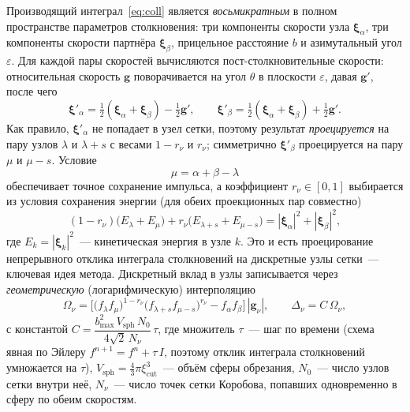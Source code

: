 \documentclass[14pt,a4paper]{extreport}
\numberwithin{equation}{chapter}
\numberwithin{figure}{chapter}
\numberwithin{table}{chapter}
\newcommand{\xv}{\boldsymbol{\xi}}
\newcommand{\gv}{\mathbf{g}}
\begin{document}
Производящий интеграл~\eqref{eq:coll} является \emph{восьмикратным} в полном пространстве параметров столкновения: три
компоненты скорости узла $\xv_\alpha$, три компоненты скорости партнёра $\xv_\beta$, прицельное расстояние $b$ и
азимутальный угол $\varepsilon$.
Для каждой пары скоростей вычисляются пост-столкновительные скорости: относительная скорость $\gv$ поворачивается на
угол $\theta$ в плоскости $\varepsilon$, давая $\gv'$, после чего
\begin{equation}
  \xv'_\alpha=\tfrac12(\xv_\alpha+\xv_\beta)-\tfrac12\gv',\qquad
  \xv'_\beta=\tfrac12(\xv_\alpha+\xv_\beta)+\tfrac12\gv'.
\end{equation}
Как правило, $\xv'_\alpha$ не попадает в узел сетки, поэтому результат \emph{проецируется} на пару узлов $\lambda$ и
$\lambda+s$ с весами $1-r_\nu$ и $r_\nu$; симметрично $\xv'_\beta$ проецируется на пару $\mu$ и $\mu-s$.
Условие
\begin{equation}
  \mu=\alpha+\beta-\lambda
\end{equation}
обеспечивает точное сохранение импульса, а коэффициент $r_\nu\in[0,1]$ выбирается из условия сохранения энергии (для
обеих проекционных пар совместно)
\begin{equation}
  (1-r_{\nu})\big(E_{\lambda}+E_{\mu}\big)+r_\nu\big(E_{\lambda+s}+E_{\mu-s}\big)=|\xv_\alpha|^2+|\xv_\beta|^2,
\end{equation}
где $E_k=|\xv_k|^2$~--- кинетическая энергия в узле $k$.
Это и есть проецирование непрерывного отклика интеграла столкновений на дискретные узлы сетки~--- ключевая идея метода.
Дискретный вклад в узлы записывается через \emph{геометрическую} (логарифмическую) интерполяцию
\begin{equation}
  \Omega_\nu=\Big[\big(f_\lambda f_\mu\big)^{1-r_\nu}\big(f_{\lambda+s}f_{\mu-s}\big)^{r_\nu}
              -f_\alpha f_\beta\Big]\,|\gv_\nu|,\qquad \Delta_\nu=C\,\Omega_\nu,
  \label{eq:omega}
\end{equation}
с константой $C=\dfrac{b_{\max}^2\,V_{\mathrm{sph}}\,N_0}{4\sqrt{2}\,N_\nu}\,\tau$, где множитель $\tau$~--- шаг по
времени (схема явная по Эйлеру $f^{n+1}=f^n+\tau\,I$, поэтому отклик интеграла столкновений умножается на $\tau$),
$V_{\mathrm{sph}}=\tfrac43\pi\xi_{\mathrm{cut}}^3$~--- объём сферы обрезания, $N_0$~--- число узлов сетки внутри неё,
$N_\nu$~--- число точек сетки Коробова, попавших одновременно в сферу по обеим скоростям.
\end{document}
